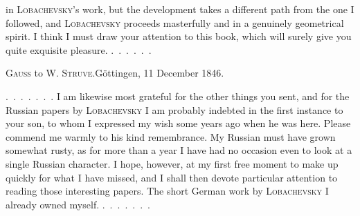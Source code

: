 %
in \textsc{Lobachevsky}'s work, but the development
takes a different path from the one I followed, and
\textsc{Lobachevsky} proceeds masterfully and in a genuinely geometrical spirit.
I think I must draw your attention to this book, which will surely
give you quite exquisite pleasure. \mbox{.\ .\ .\ .\ .\ .}

\par\bigskip{}

\begin{center}
\textsc{Gauss} to W. \textsc{Struve}.\quad Göttingen, 11 December 1846.
\end{center}

\mbox{.\ .\ .\ .\ .\ .\ .} I am likewise most grateful for the other things you sent,
and for the Russian papers by
\textsc{Lobachevsky} I am probably indebted in the first instance to your son, to whom
I expressed my wish some years ago when he was here.
Please commend me warmly to his kind remembrance. My
Russian must have grown somewhat rusty,
as for more than a year I have had no occasion
even to look at a single Russian character. I hope, however, at my first free
moment to make up quickly for what I have missed, and I shall then devote particular attention
to reading those interesting papers. The short
German work by \textsc{Lobachevsky} I already
owned myself. \mbox{.\ .\ .\ .\ .\ .\ .}


